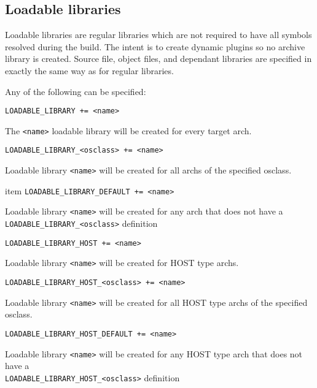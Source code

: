 \subsection{Loadable libraries}


Loadable libraries are regular libraries which are not required to have all symbols resolved during the build. The intent is 
to create dynamic plugins so no archive library is created. Source file, object files, and dependant libraries are specified in 
exactly the same way as for regular libraries.

Any of the following can be specified:

\begin{description}
\item {}\verb|LOADABLE_LIBRARY += <name>|

The \verb|<name>| loadable library will be created for every target arch.

\item \verb|LOADABLE_LIBRARY_<osclass> += <name>|

Loadable library \verb|<name>| will be created for all archs of the specified osclass.

item \verb|LOADABLE_LIBRARY_DEFAULT += <name>|

Loadable library \verb|<name>| will be created for any arch that does not have a 
\verb|LOADABLE_LIBRARY_<osclass>| definition

\item 

\item {}\verb|LOADABLE_LIBRARY_HOST += <name>|

Loadable library \verb|<name>| will be created for HOST type archs.

\item \verb|LOADABLE_LIBRARY_HOST_<osclass> += <name>|

Loadable library \verb|<name>| will be created for all HOST type archs of the specified osclass.

\item \verb|LOADABLE_LIBRARY_HOST_DEFAULT += <name>|

Loadable library \verb|<name>| will be created for any HOST type arch that does not have a \\
\verb|LOADABLE_LIBRARY_HOST_<osclass>| definition

\end{description}

